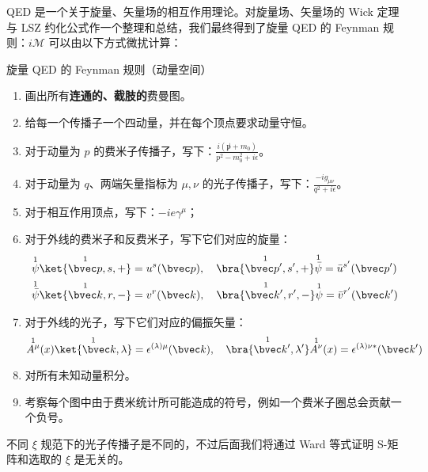 QED 是一个关于旋量、矢量场的相互作用理论。对旋量场、矢量场的 Wick 定理与 LSZ 约化公式作一个整理和总结，我们最终得到了旋量 QED 的 Feynman 规则：$i\mathcal{M}$ 可以由以下方式微扰计算：
\begin{theorem}{旋量 QED 的 Feynman 规则（动量空间）}

\begin{enumerate}
\item 画出所有\textbf{连通的、截肢的}费曼图。
\item 给每一个传播子一个四动量，并在每个顶点要求动量守恒。
\item 对于动量为 $p$ 的费米子传播子，写下：$\frac{i(\not p+m_0)}{p^2-m_0^2 + i\epsilon}$。
\item 对于动量为 $q$、两端矢量指标为 $\mu,\nu$ 的光子传播子，写下：$\frac{-ig_{\mu\nu}}{q^2 + i\epsilon}$。
\item 对于相互作用顶点，写下：$-ie\gamma^\mu$；
\item 对于外线的费米子和反费米子，写下它们对应的旋量：
\begin{align*}
&\overset{1}{\psi}\overset{1}{\ket{\bvec p,s,+}}=u^s(\bvec p),\quad \overset{1}{\bra{\bvec p',s',+}} \overset{1}{\bar\psi}=\bar u^{s'}(\bvec p')\\
&\overset{1}{\bar\psi}\overset{1}{\ket{\bvec k,r,-}}=v^{r}(\bvec k),\quad \overset{1}{\bra{\bvec k',r',-}} \overset{1}{\psi}=\bar v^{r'}(\bvec k')
\end{align*}
\item 对于外线的光子，写下它们对应的偏振矢量：
\[
\overset{1}{A^\mu}(x) \overset{1}{\ket{\bvec k,\lambda}}=\epsilon^{(\lambda)\mu}(\bvec k),\quad \overset{1}{\bra{\bvec k',\lambda'}}\overset{1}{A^\nu}(x)=\epsilon^{(\lambda)\nu*}(\bvec k')
\]
\item 
对所有未知动量积分。
\item 
考察每个图中由于费米统计所可能造成的符号，例如一个费米子圈总会贡献一个负号。
\end{enumerate}
\end{theorem}
不同 $\xi$ 规范下的光子传播子是不同的，不过后面我们将通过 Ward 等式证明 S-矩阵和选取的 $\xi$ 是无关的。
